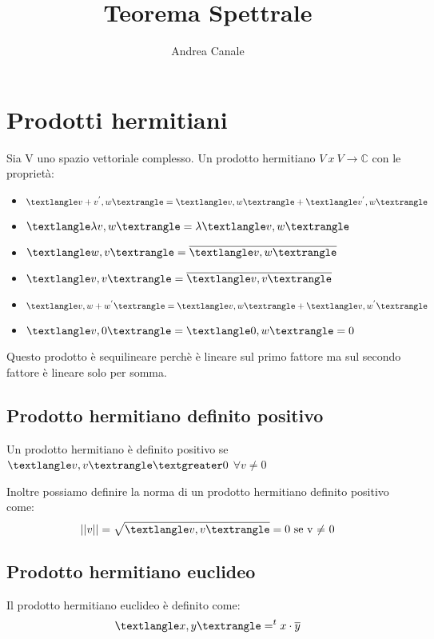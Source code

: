 \documentclass[a4paper, 10pt]{article}
\title{Teorema Spettrale}
\author{Andrea Canale}
\begin{document}
	\maketitle
	\tableofcontents
	
\section{Prodotti hermitiani}

Sia V uno spazio vettoriale complesso. Un prodotto hermitiano $V\ x\ V \rightarrow \mathbb{C}$ con le proprietà:

\begin{itemize}
	\item $\textlangle v + v^{'}, w \textrangle = \textlangle v, w \textrangle + \textlangle v^{'}, w \textrangle$
	\item $\textlangle \lambda v, w \textrangle = \lambda \textlangle v, w \textrangle$
	\item $\textlangle w, v \textrangle = \overline{ \textlangle v, w \textrangle}$
	\item $\textlangle v, v \textrangle = \overline{ \textlangle v, v \textrangle}$
	\item $\textlangle v, w + w^{'} \textrangle = \textlangle v, w \textrangle + \textlangle v, w^{'}\textrangle$
	\item $\textlangle v, 0 \textrangle = \textlangle 0, w \textrangle = 0$
\end{itemize}

Questo prodotto è sequilineare perchè è lineare sul primo fattore ma sul secondo fattore è lineare solo per somma.

\subsection{Prodotto hermitiano definito positivo}

Un prodotto hermitiano è definito positivo se $\textlangle v, v \textrangle \textgreater 0$ $\forall v \neq 0$

Inoltre possiamo definire la norma di un prodotto hermitiano definito positivo come: $$||v|| = \sqrt{\textlangle v, v \textrangle} = 0 \text{ se v $\neq$ 0}$$ 

\subsection{Prodotto hermitiano euclideo}

Il prodotto hermitiano euclideo è definito come: $$\textlangle x,y \textrangle = ^tx \cdot \overline{y}$$
\end{document}

